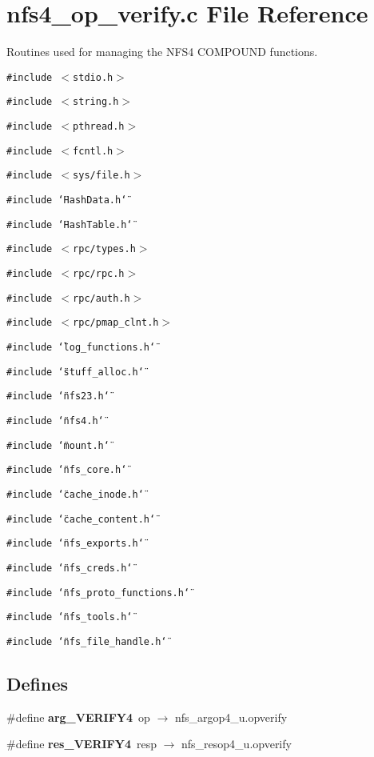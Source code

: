 \section{nfs4\_\-op\_\-verify.c File Reference}
\label{nfs4__op__verify_8c}
Routines used for managing the NFS4 COMPOUND functions. 

{\tt \#include $<$stdio.h$>$}\par
{\tt \#include $<$string.h$>$}\par
{\tt \#include $<$pthread.h$>$}\par
{\tt \#include $<$fcntl.h$>$}\par
{\tt \#include $<$sys/file.h$>$}\par
{\tt \#include \char`\"{}Hash\-Data.h\char`\"{}}\par
{\tt \#include \char`\"{}Hash\-Table.h\char`\"{}}\par
{\tt \#include $<$rpc/types.h$>$}\par
{\tt \#include $<$rpc/rpc.h$>$}\par
{\tt \#include $<$rpc/auth.h$>$}\par
{\tt \#include $<$rpc/pmap\_\-clnt.h$>$}\par
{\tt \#include \char`\"{}log\_\-functions.h\char`\"{}}\par
{\tt \#include \char`\"{}stuff\_\-alloc.h\char`\"{}}\par
{\tt \#include \char`\"{}nfs23.h\char`\"{}}\par
{\tt \#include \char`\"{}nfs4.h\char`\"{}}\par
{\tt \#include \char`\"{}mount.h\char`\"{}}\par
{\tt \#include \char`\"{}nfs\_\-core.h\char`\"{}}\par
{\tt \#include \char`\"{}cache\_\-inode.h\char`\"{}}\par
{\tt \#include \char`\"{}cache\_\-content.h\char`\"{}}\par
{\tt \#include \char`\"{}nfs\_\-exports.h\char`\"{}}\par
{\tt \#include \char`\"{}nfs\_\-creds.h\char`\"{}}\par
{\tt \#include \char`\"{}nfs\_\-proto\_\-functions.h\char`\"{}}\par
{\tt \#include \char`\"{}nfs\_\-tools.h\char`\"{}}\par
{\tt \#include \char`\"{}nfs\_\-file\_\-handle.h\char`\"{}}\par
\subsection*{Defines}
\begin{CompactItemize}
\item 
\#define {\bf arg\_\-VERIFY4}\ op $\rightarrow$ nfs\_\-argop4\_\-u.opverify
\item 
\#define {\bf res\_\-VERIFY4}\ resp $\rightarrow$ nfs\_\-resop4\_\-u.opverify
\end{CompactItemize}
